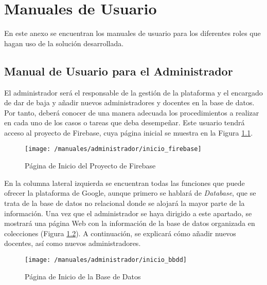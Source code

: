 \chapter{Manuales de Usuario}
\label{chap:manuales}
En este anexo se encuentran los manuales de usuario para los diferentes roles que hagan uso de la solución desarrollada.

\section*{Manual de Usuario para el Administrador}
El administrador será el responsable de la gestión de la plataforma y el encargado de dar de baja y añadir nuevos administradores y docentes en la base de datos. Por tanto, deberá conocer de una manera adecuada los procedimientos a realizar en cada uno de los casos o tareas que deba desempeñar. Este usuario tendrá acceso al proyecto de Firebase, cuya página inicial se muestra en la Figura \ref{fig:iniciofirebase}.

\begin{figure}[!h]
	\begin{center}
		\texttt{[image: /manuales/administrador/inicio\_firebase]}
		\caption{Página de Inicio del Proyecto de Firebase}
		\label{fig:iniciofirebase}
	\end{center}
\end{figure}

\clearpage

En la columna lateral izquierda se encuentran todas las funciones que puede ofrecer la plataforma de Google, aunque primero se hablará de \textit{Database}, que se trata de la base de datos no relacional donde se alojará la mayor parte de la información. Una vez que el administrador se haya dirigido a este apartado, se mostrará una página Web con la información de la base de datos organizada en colecciones (Figura \ref{fig:iniciobbdd}). A continuación, se explicará cómo añadir nuevos docentes, así como nuevos administradores.

\begin{figure}[!h]
	\begin{center}
		\texttt{[image: /manuales/administrador/inicio\_bbdd]}
		\caption{Página de Inicio de la Base de Datos}
		\label{fig:iniciobbdd}
	\end{center}
\end{figure}

\clearpage

